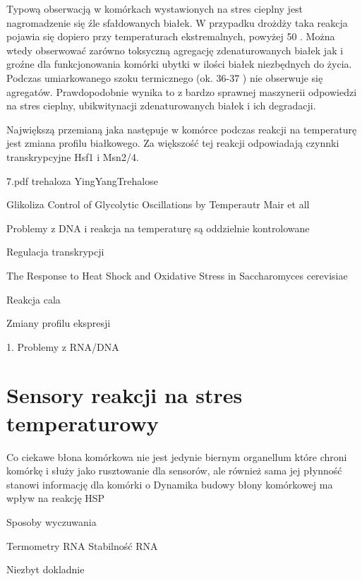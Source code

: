 \documentclass{pracamgr}
\begin{document}
 Typową obserwacją w komórkach wystawionych na stres cieplny jest nagromadzenie się źle sfałdowanych białek. 
 W przypadku drożdży taka reakcja pojawia się dopiero przy temperaturach ekstremalnych, powyżej 50 \textcelsius. Można
 wtedy obserwować zarówno toksyczną agregację zdenaturowanych białek jak i groźne dla funkcjonowania komórki ubytki w 
 ilości białek niezbędnych do życia. Podczas umiarkowanego szoku termicznego (ok. 36-37 \textcelsius) nie obserwuje się
 agregatów. Prawdopodobnie wynika to z bardzo sprawnej maszynerii odpowiedzi na stres cieplny, ubikwitynacji zdenaturowanych
 białek i ich degradacji\cite{Bible}.
 
 Największą przemianą jaka następuje w komórce podczas reakcji na temperaturę jest zmiana profilu białkowego. Za większość tej 
 reakcji odpowiadają czynnki transkrypcyjne Hsf1 i Msn2/4. 
 
 7.pdf
 trehaloza YingYangTrehalose
 
 Glikoliza Control of Glycolytic Oscillations by Temperautr Mair et all
 
Problemy z DNA i reakcja na temperaturę są oddzielnie kontrolowane \cite{Duallyregulated85}

Regulacja transkrypcji \cite{Yamamoto08}

The Response to Heat Shock and Oxidative Stress
in Saccharomyces cerevisiae \cite{Morano12}

Reakcja cala \cite{Bible}
 

Zmiany profilu ekspresji \cite{Gash00}

1. Problemy z RNA/DNA


\section{Sensory reakcji na stres temperaturowy}

 Co ciekawe błona komórkowa nie jest jedynie biernym organellum które chroni
 komórkę i służy jako rusztowanie dla sensorów, ale również sama jej płynność stanowi informację dla komórki o 
 Dynamika budowy błony komórkowej ma wpływ na reakcję HSP\cite{Carratu96}
 
 Sposoby wyczuwania \cite{SensingLesson}

Termometry RNA \cite{RNAterm}
Stabilność RNA \cite{Roca11}

Niezbyt dokladnie

 
\end{document}
